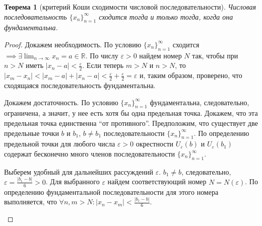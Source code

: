 \documentclass[a4paper,12pt]{article} %
\newtheorem{theorem}{Теорема}[section]
\theoremstyle{remark}
\theoremstyle{definition}
\begin{document}
\begin{theorem}[критерий Коши сходимости числовой последовательности]
	Числовая последовательность $\{x_n\}_{n=1}^{\infty}$ сходится тогда и только тогда, когда она фундаментальна.	
\end{theorem}
\begin{proof}
	Докажем необходимость.
	По условию $\{x_n\}_{n=1}^{\infty}$ сходится $\implies \exists \lim_{n \to \infty} x_n = a \in  \mathbb{R}$. По числу $\varepsilon>0$ найдем номер $N$ так, чтобы при $n > N$ иметь $|x_n-a| < \frac{\varepsilon}{2}$. Если теперь $m>N$ и $n>N$, то $|x_{m} - x_{n}| < |x_{m}-a| + |x_{n}-a| < \frac{\varepsilon}{2} + \frac{\varepsilon}{2} = \varepsilon$ и, таким образом, проверено, что сходящаяся последовательность фундаментальна.

	Докажем достаточность.
	По условию $\{x_n\}_{n=1}^{\infty}$ фундаментальна, следовательно, ограничена, а значит, у нее есть хотя бы одна предельная точка. Докажем, что эта предельная точка единственна ``от противного''. Предположим, что существует две предельные точки $b$ и $b_1$, $b\neq b_1$ последовательности $\{x_n\}_{n=1}^{\infty}$. По определению предельной точки для любого числа $\varepsilon>0$ окрестности $U_\varepsilon(b)$ и $U_\varepsilon(b_1)$ содержат бесконечно много членов последовательности $\{x_n\}_{n=1}^{\infty}$.

	Выберем удобный для дальнейших рассуждений $\varepsilon$. $b_1\neq b$, следовательно, $\varepsilon=\frac{|b_1-b|}{6}>0$. Для выбранного $\varepsilon$ найдем соответствующий номер $N=N(\varepsilon)$. По определению фундаментальной последовательности для этого номера выполняется, что $\forall n, m > N : |x_{n}-x_{m}| < \frac{|b_1-b|}{6}$. 
\begin{center}
\end{center}


\end{proof}
\end{document}

